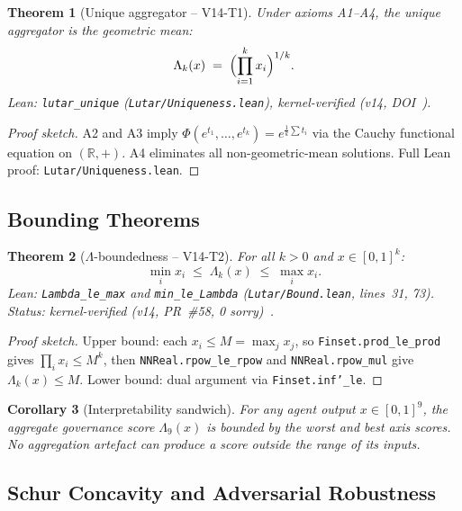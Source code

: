 \documentclass[11pt,letterpaper]{article}
\newtheorem{theorem}{Theorem}[section]
\newtheorem{corollary}[theorem]{Corollary}
\theoremstyle{definition}
\theoremstyle{remark}
\begin{document}
\begin{theorem}[Unique aggregator -- V14-T1]
\label{thm:unique-agg}
Under axioms A1--A4, the unique aggregator is the geometric mean:
\begin{equation}
  \Lambda_k(x) \;=\; \Bigl(\prod_{i=1}^{k} x_i\Bigr)^{1/k}.
  \label{eq:lambda-geomean}
\end{equation}
\textup{Lean:} \texttt{lutar\_unique}
(\texttt{Lutar/Uniqueness.lean}),
kernel-verified (v14, DOI~\cite{LutarThesisV14}).
\end{theorem}
\begin{proof}[Proof sketch]
A2 and A3 imply \(\Phi(e^{t_1},\ldots,e^{t_k}) = e^{\frac{1}{k}\sum t_i}\)
via the Cauchy functional equation on \((\mathbb{R},+)\).
A4 eliminates all non-geometric-mean solutions.
Full Lean proof: \texttt{Lutar/Uniqueness.lean}.
\end{proof}

\subsection{Bounding Theorems}

\begin{theorem}[\(\Lambda\)-boundedness -- V14-T2]
\label{thm:lambda-bound}
For all \(k > 0\) and \(x \in [0,1]^k\):
\begin{equation}
  \min_i x_i \;\le\; \Lambda_k(x) \;\le\; \max_i x_i.
  \label{eq:sandwich}
\end{equation}
\textup{Lean:} \texttt{Lambda\_le\_max} and \texttt{min\_le\_Lambda}
(\texttt{Lutar/Bound.lean}, lines~31, 73).
Status: kernel-verified (v14, PR~\#58, 0 sorry)~\cite{LutarThesisV14}.
\end{theorem}
\begin{proof}[Proof sketch]
Upper bound: each \(x_i \le M = \max_j x_j\),
so \texttt{Finset.prod\_le\_prod} gives \(\prod_i x_i \le M^k\),
then \texttt{NNReal.rpow\_le\_rpow} and \texttt{NNReal.rpow\_mul}
give \(\Lambda_k(x) \le M\).
Lower bound: dual argument via \texttt{Finset.inf'\_le}.
\end{proof}

\begin{corollary}[Interpretability sandwich]
\label{cor:sandwich}
For any agent output \(x \in [0,1]^9\), the aggregate governance score
\(\Lambda_9(x)\) is bounded by the worst and best axis scores.
No aggregation artefact can produce a score outside the range of its
inputs.
\end{corollary}

\subsection{Schur Concavity and Adversarial Robustness}
\end{document}
